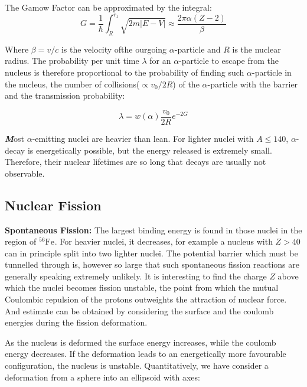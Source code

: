\documentclass[10pt,a4paper]{article}
\newenvironment{callout}
	{\begin{calloutbox}\color{charcoal}\textbf\textit}
	{\end{calloutbox}}
\newcommand{\ch}[5]{{}^{#2}_{#3}\!\text{#1}^{#4}_{#5}}
\begin{document}
The Gamow Factor can be approximated by the integral:
\begin{equation}
    G = \frac{1}{\hbar}\int_R^{r_1} \sqrt{2m|E-V|} \approx \frac{2\pi\alpha(Z-2)}{\beta}
\end{equation}

Where $\beta = v/c$ is the velocity ofthe ourgoing $\alpha$-particle and $R$ is the nuclear radius. The probability per unit time $\lambda$ for an $\alpha$-particle to escape from the nucleus is therefore proportional to the probability of finding such $\alpha$-particle in the nucleus, the number of collisions($\propto v_0/2R$) of the $\alpha$-particle with the barrier and the transmission probability:

\begin{equation}
    \lambda = w(\alpha)\frac{v_0}{2R}e^{-2G}
\end{equation}

\begin{callout}
    Most $\alpha$-emitting nuclei are heavier than lean. For lighter nuclei with $A \leq 140$, $\alpha$-decay is energetically possible, but the energy released is extremely small. Therefore, their nuclear lifetimes are so long that decays are usually not observable.
\end{callout}

\subsection{Nuclear Fission}
\textbf{Spontaneous Fission:} The largest binding energy is found in those nuclei in the region of $\ch{Fe}{56}{}{}{}$. For heavier nuclei, it decreases, for example a nucleus with $Z>40$ can in principle split into two lighter nuclei. The potential barrier which must be tunnelled through is, however so large that such spontaneous fission reactions are generally speaking extremely unlikely. It is interesting to find the charge $Z$ above which the nuclei becomes fission unstable, the point from which the mutual Coulombic repulsion of the protons outweights the attraction of nuclear force. And estimate can be obtained by considering the surface and the coulomb energies during the fission deformation.

As the nucleus is deformed the surface energy increases, while the coulomb energy decreases. If the deformation leads to an energetically more favourable configuration, the nucleus is unstable. Quantitatively, we have consider a deformation from a sphere into an ellipsoid with axes:
\end{document}
